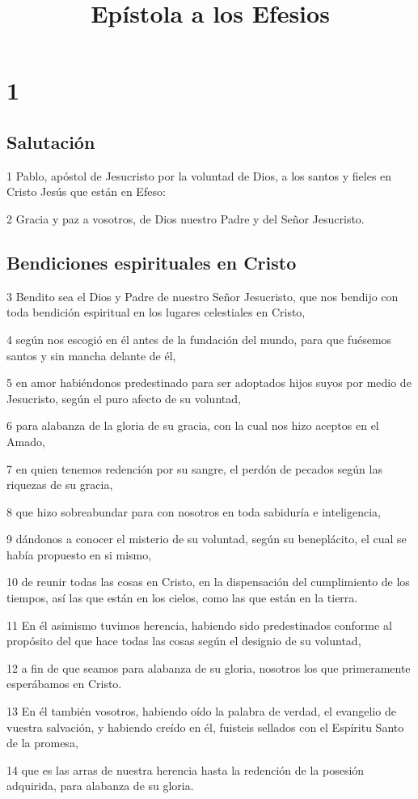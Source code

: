 
\title{Epístola a los Efesios}

\chapter{1}

\section*{Salutación}

\par 1 Pablo, apóstol de Jesucristo por la voluntad de Dios, a los santos y fieles en Cristo Jesús que están en Efeso:
\par 2 Gracia y paz a vosotros, de Dios nuestro Padre y del Señor Jesucristo.

\section*{Bendiciones espirituales en Cristo}

\par 3 Bendito sea el Dios y Padre de nuestro Señor Jesucristo, que nos bendijo con toda bendición espiritual en los lugares celestiales en Cristo,
\par 4 según nos escogió en él antes de la fundación del mundo, para que fuésemos santos y sin mancha delante de él,
\par 5 en amor habiéndonos predestinado para ser adoptados hijos suyos por medio de Jesucristo, según el puro afecto de su voluntad,
\par 6 para alabanza de la gloria de su gracia, con la cual nos hizo aceptos en el Amado,
\par 7 en quien tenemos redención por su sangre, el perdón de pecados según las riquezas de su gracia,
\par 8 que hizo sobreabundar para con nosotros en toda sabiduría e inteligencia,
\par 9 dándonos a conocer el misterio de su voluntad, según su beneplácito, el cual se había propuesto en si mismo,
\par 10 de reunir todas las cosas en Cristo, en la dispensación del cumplimiento de los tiempos, así las que están en los cielos, como las que están en la tierra.
\par 11 En él asimismo tuvimos herencia, habiendo sido predestinados conforme al propósito del que hace todas las cosas según el designio de su voluntad,
\par 12 a fin de que seamos para alabanza de su gloria, nosotros los que primeramente esperábamos en Cristo.
\par 13 En él también vosotros, habiendo oído la palabra de verdad, el evangelio de vuestra salvación, y habiendo creído en él, fuisteis sellados con el Espíritu Santo de la promesa,
\par 14 que es las arras de nuestra herencia hasta la redención de la posesión adquirida, para alabanza de su gloria.


